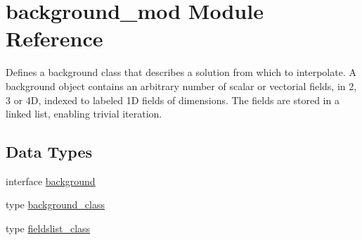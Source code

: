 \hypertarget{namespacebackground__mod}{}\section{background\+\_\+mod Module Reference}
\label{namespacebackground__mod}


Defines a background class that describes a solution from which to interpolate. A background object contains an arbitrary number of scalar or vectorial fields, in 2, 3 or 4D, indexed to labeled 1D fields of dimensions. The fields are stored in a linked list, enabling trivial iteration.  


\subsection*{Data Types}
\begin{DoxyCompactItemize}
\item 
interface \mbox{\hyperlink{interfacebackground__mod_1_1background}{background}}
\item 
type \mbox{\hyperlink{structbackground__mod_1_1background__class}{background\+\_\+class}}
\item 
type \mbox{\hyperlink{structbackground__mod_1_1fieldslist__class}{fieldslist\+\_\+class}}
\end{DoxyCompactItemize}
